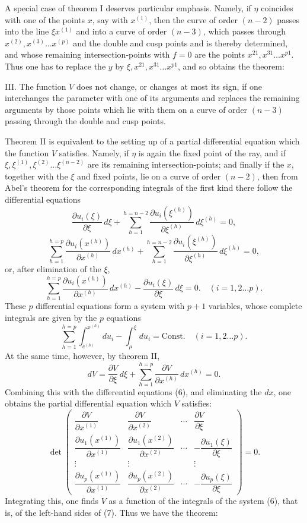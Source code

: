 \documentclass[10pt]{article}
\begin{document}
A special case of theorem I deserves particular emphasis. Namely, if \(\eta\) coincides with one of the points \(x\), say with \(x^{(1)}\), then the curve of order \((n-2)\) passes into the line \(\xi x^{(1)}\) and into a curve of order \((n-3)\), which passes through \(x^{(2)},x^{(3)}\ldots x^{(p)}\) and the double and cusp points and is thereby determined, and whose remaining intersection-points with \(f=0\) are the points \(x^{21},x^{31}\ldots x^{p1}\). Thus one has to replace the \(y\) by \(\xi,x^{21},x^{31}\ldots x^{p1}\), and so obtains the theorem:

III. The function \(V\) does not change, or changes at most its sign, if one interchanges the parameter with one of its arguments and replaces the remaining arguments by those points which lie with them on a curve of order \((n-3)\) passing through the double and cusp points.

Theorem II is equivalent to the setting up of a partial differential equation which the function \(V\) satisfies. Namely, if \(\eta\) is again the fixed point of the ray, and if \(\xi,\xi^{(1)},\xi^{(2)}\ldots\xi^{(n-2)}\) are its remaining intersection-points; and finally if the \(x\), together with the \(\xi\) and fixed points, lie on a curve of order \((n-2)\), then from Abel's theorem for the corresponding integrals of the first kind there follow the differential equations
\[
\frac{\partial u_i(\xi)}{\partial\xi}\,d\xi+
\sum_{h=1}^{h=n-2}\frac{\partial u_i(\xi^{(h)})}{\partial\xi^{(h)}}\,d\xi^{(h)}=0,
\]
\[
\sum_{h=1}^{h=p}\frac{\partial u_i(x^{(h)})}{\partial x^{(h)}}\,dx^{(h)}+
\sum_{h=1}^{h=n-2}\frac{\partial u_i(\xi^{(h)})}{\partial\xi^{(h)}}\,d\xi^{(h)}=0,
\]
or, after elimination of the \(\xi\),
\[
\tag{6}\sum_{h=1}^{h=p}\frac{\partial u_i(x^{(h)})}{\partial x^{(h)}}\,dx^{(h)}-\frac{\partial u_i(\xi)}{\partial\xi}\,d\xi=0.
\quad (i=1,2\ldots p).
\]
These \(p\) differential equations form a system with \(p+1\) variables, whose complete integrals are given by the \(p\) equations
\[
\tag{7}\sum_{h=1}^{h=p}\int_{c^{(h)}}^{x^{(h)}}du_i-\int_{\mu}^{\xi}du_i=\mathrm{Const.}
\quad (i=1,2\ldots p).
\]
At the same time, however, by theorem II,
\[
dV=\frac{\partial V}{\partial\xi}\,d\xi+
\sum_{h=1}^{h=p}\frac{\partial V}{\partial x^{(h)}}\,dx^{(h)}=0.
\]
Combining this with the differential equations (6), and eliminating the \(dx\), one obtains the partial differential equation which \(V\) satisfies:
\[
\det\begin{pmatrix}
\dfrac{\partial V}{\partial x^{(1)}} & \dfrac{\partial V}{\partial x^{(2)}} & \cdots & \dfrac{\partial V}{\partial\xi}\\[0.7em]
\dfrac{\partial u_1(x^{(1)})}{\partial x^{(1)}} & \dfrac{\partial u_1(x^{(2)})}{\partial x^{(2)}} & \cdots & -\dfrac{\partial u_1(\xi)}{\partial\xi}\\
\vdots & \vdots & & \vdots\\
\dfrac{\partial u_p(x^{(1)})}{\partial x^{(1)}} & \dfrac{\partial u_p(x^{(2)})}{\partial x^{(2)}} & \cdots & -\dfrac{\partial u_p(\xi)}{\partial\xi}
\end{pmatrix}=0.
\]
Integrating this, one finds \(V\) as a function of the integrals of the system (6), that is, of the left-hand sides of (7). Thus we have the theorem:
\end{document}
